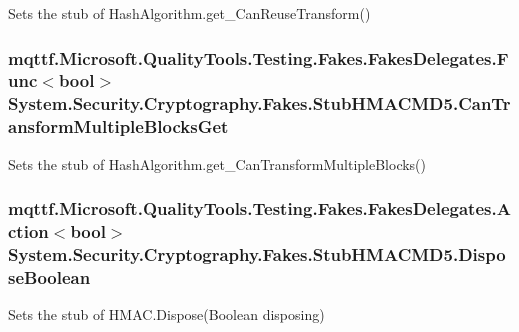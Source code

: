 Sets the stub of Hash\-Algorithm.\-get\-\_\-\-Can\-Reuse\-Transform()

\hypertarget{class_system_1_1_security_1_1_cryptography_1_1_fakes_1_1_stub_h_m_a_c_m_d5_afe40ac0752d6c70845b3ccc89f6b436d}{
\subsubsection[{Can\-Transform\-Multiple\-Blocks\-Get}]{\setlength{\rightskip}{0pt plus 5cm}mqttf.\-Microsoft.\-Quality\-Tools.\-Testing.\-Fakes.\-Fakes\-Delegates.\-Func$<$bool$>$ System.\-Security.\-Cryptography.\-Fakes.\-Stub\-H\-M\-A\-C\-M\-D5.\-Can\-Transform\-Multiple\-Blocks\-Get}}\label{class_system_1_1_security_1_1_cryptography_1_1_fakes_1_1_stub_h_m_a_c_m_d5_afe40ac0752d6c70845b3ccc89f6b436d}


Sets the stub of Hash\-Algorithm.\-get\-\_\-\-Can\-Transform\-Multiple\-Blocks()

\hypertarget{class_system_1_1_security_1_1_cryptography_1_1_fakes_1_1_stub_h_m_a_c_m_d5_afa698daff50103339f95750999a3f67a}{
\subsubsection[{Dispose\-Boolean}]{\setlength{\rightskip}{0pt plus 5cm}mqttf.\-Microsoft.\-Quality\-Tools.\-Testing.\-Fakes.\-Fakes\-Delegates.\-Action$<$bool$>$ System.\-Security.\-Cryptography.\-Fakes.\-Stub\-H\-M\-A\-C\-M\-D5.\-Dispose\-Boolean}}\label{class_system_1_1_security_1_1_cryptography_1_1_fakes_1_1_stub_h_m_a_c_m_d5_afa698daff50103339f95750999a3f67a}


Sets the stub of H\-M\-A\-C.\-Dispose(\-Boolean disposing)

